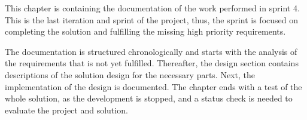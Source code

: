 This chapter is containing the documentation of the work performed in sprint 4.
This is the last iteration and sprint of the project, thus, the sprint is focused on completing the solution and fulfilling the missing high priority requirements.

The documentation is structured chronologically and starts with the analysis of the requirements that is not yet fulfilled.
Thereafter, the design section contains descriptions of the solution design for the necessary parts.
Next, the implementation of the design is documented.
The chapter ends with a test of the whole solution, as the development is stopped, and a status check is needed to evaluate the project and solution.

